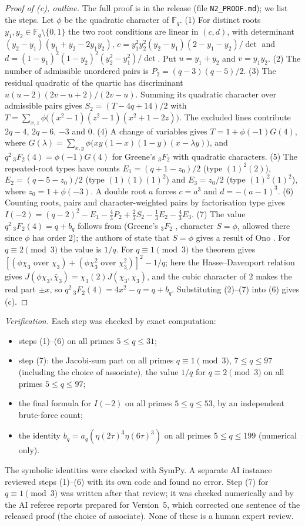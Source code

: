 \documentclass[11pt]{article}
\begin{document}
\begin{proof}[Proof of (c), outline]
The full proof is in the release (file \texttt{N2\_PROOF.md}); we list the steps. Let $\phi$ be the quadratic character of $\mathbb F_q$.
(1) For distinct roots $y_1,y_2\in\mathbb F_q\setminus\{0,1\}$ the two root conditions are linear in $(c,d)$, with determinant
$(y_2-y_1)(y_1+y_2-2y_1y_2)$, $c=y_1^2y_2^2(y_2-y_1)(2-y_1-y_2)/\det$ and $d=(1-y_1)^2(1-y_2)^2(y_2^2-y_1^2)/\det$.
Put $u=y_1+y_2$ and $v=y_1y_2$.
(2) The number of admissible unordered pairs is $P_2=(q-3)(q-5)/2$.
(3) The residual quadratic of the quartic has discriminant $u(u-2)(2v-u+2)/(2v-u)$. Summing its quadratic character over admissible pairs gives
$S_2=(T-4q+14)/2$ with $T=\sum_{x,z}\phi\big((x^2-1)(z^2-1)(x^2+1-2z)\big)$. The excluded lines contribute $2q-4$, $2q-6$, $-3$ and $0$.
(4) A change of variables gives $T=1+\phi(-1)G(4)$, where $G(\lambda)=\sum_{x,y}\phi\big(xy(1-x)(1-y)(x-\lambda y)\big)$, and $q^2\,{}_3F_2(4)=\phi(-1)G(4)$
for Greene's ${}_3F_2$ with quadratic characters.
(5) The repeated-root types have counts $E_1=(q+1-z_0)/2$ (type $(1)^2(2)$), $E_2=(q-5-z_0)/2$ (type $(1)(1)(1)^2$) and $E_3=z_0/2$ (type $(1)^2(1)^2$), where $z_0=1+\phi(-3)$. A double root $a$ forces $c=a^3$ and $d=-(a-1)^3$.
(6) Counting roots, pairs and character-weighted pairs by factorisation type gives
$I(-2)=(q-2)^2-E_1-\tfrac43P_2+\tfrac23S_2-\tfrac13E_2-\tfrac43E_3$.
(7) The value $q^2\,{}_3F_2(4)=q+b_q$ follows from \cite[Thm.~1.7]{BK} (Greene's ${}_3F_2$ \cite{Gre}, character $S=\phi$, allowed there since $\phi$ has order $2$); the authors of \cite{BK}
state that $S=\phi$ gives a result of Ono \cite{On}. For $q\equiv2\pmod 3$ the value is $1/q$.
For $q\equiv1\pmod3$ the theorem gives $[(\phi\chi_3\text{ over }\chi_3)+(\phi\chi_3^2\text{ over }\chi_3^2)]^2-1/q$; here the Hasse--Davenport relation \cite{IR} gives
$J(\phi\chi_3,\bar\chi_3)=\chi_3(2)\overline{J(\chi_3,\chi_3)}$, and the cubic character of $2$ \cite{IR} makes the real part $\pm x$, so $q^2\,{}_3F_2(4)=4x^2-q=q+b_q$.
Substituting (2)--(7) into (6) gives (c).
\end{proof}

\emph{Verification.} Each step was checked by exact computation:
\begin{itemize}
\item steps (1)--(6) on all primes $5\le q\le31$;
\item step (7): the Jacobi-sum part on all primes $q\equiv1\pmod3$, $7\le q\le97$ (including the choice of associate), the value $1/q$ for $q\equiv2\pmod3$ on all primes $5\le q\le97$;
\item the final formula for $I(-2)$ on all primes $5\le q\le53$, by an independent brute-force count;
\item the identity $b_q=a_q(\eta(2\tau)^3\eta(6\tau)^3)$ on all primes $5\le q\le199$ (numerical only).
\end{itemize}
The symbolic identities were checked with SymPy. A separate AI instance reviewed steps (1)--(6) with its own code and found no error. Step (7) for $q\equiv1\pmod3$ was written
after that review; it was checked numerically and by the AI referee reports prepared for Version~5, which corrected one sentence of the released proof (the choice of associate). None of these is a human expert review.
\end{document}

